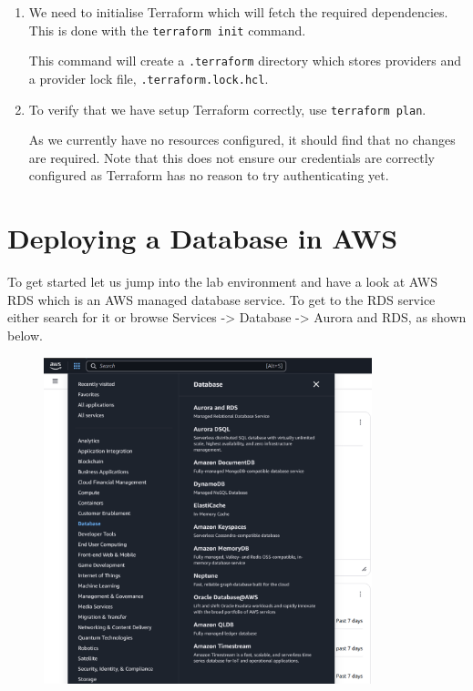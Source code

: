 \documentclass{csse4400}
\begin{document}
\begin{enumerate}
\item We need to initialise Terraform which will fetch the required dependencies.
    This is done with the \texttt{terraform init} command.

This command will create a \texttt{.terraform} directory which stores providers and a provider lock file, \texttt{.terraform.lock.hcl}.

\item To verify that we have setup Terraform correctly, use \texttt{terraform plan}.

As we currently have no resources configured, it should find that no changes are required.
Note that this does not ensure our credentials are correctly configured as Terraform has no reason to try authenticating yet.

\end{enumerate}


\section{Deploying a Database in AWS}



\noindent
To get started let us jump into the lab environment and have a look at AWS RDS which is an AWS managed database service. To get to the RDS service either search for it or browse Services -> Database -> Aurora and RDS, as shown below.

\begin{figure}[H]
\centering
\includegraphics[trim=0 180 0 0,clip,width=0.85\textwidth]{images/aws_1}
\end{figure}
\end{document}

